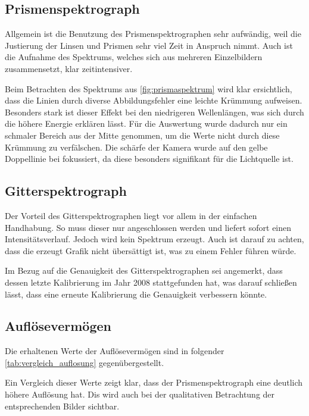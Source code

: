 \documentclass[12pt,english,ngerman]{scrartcl}
\begin{document}
\subsection{Prismenspektrograph}

Allgemein ist die Benutzung des Prismenspektrographen sehr aufwändig, weil die
Justierung der Linsen und Prismen sehr viel Zeit in Anspruch nimmt. Auch ist
die Aufnahme des Spektrums, welches sich aus mehreren Einzelbildern
zusammensetzt, klar zeitintensiver.

Beim Betrachten des Spektrums aus \autoref{fig:prismaspektrum} wird klar
ersichtlich, dass die Linien durch diverse Abbildungsfehler eine leichte
Krümmung aufweisen. Besonders stark ist dieser Effekt bei den niedrigeren
Wellenlängen, was sich durch die höhere Energie erklären lässt. Für die
Auswertung wurde dadurch nur ein schmaler Bereich aus der Mitte genommen, um
die Werte nicht durch diese Krümmung zu verfälschen. Die schärfe der Kamera
wurde auf den gelbe Doppellinie bei 
fokussiert, da diese besonders signifikant für die Lichtquelle ist.

\subsection{Gitterspektrograph}

Der Vorteil des Gitterspektrographen liegt vor allem in der einfachen
Handhabung. So muss dieser nur angeschlossen werden und liefert sofort einen
Intensitätsverlauf. Jedoch wird kein Spektrum erzeugt. Auch ist darauf zu
achten, dass die erzeugt Grafik nicht übersättigt ist, was zu einem Fehler
führen würde.

Im Bezug auf die Genauigkeit des Gitterspektrographen sei angemerkt, dass
dessen letzte Kalibrierung im Jahr 2008 stattgefunden hat, was darauf schließen
lässt, dass eine erneute Kalibrierung die Genauigkeit verbessern könnte.

\subsection{Auflösevermögen}
Die erhaltenen Werte der Auflösevermögen sind in folgender
\autoref{tab:vergleich_auflosung} gegenübergestellt.

Ein Vergleich dieser Werte zeigt klar, dass der Prismenspektrograph eine
deutlich höhere Auflösung hat. Dis wird auch bei der qualitativen Betrachtung
der entsprechenden Bilder sichtbar.
\end{document}
